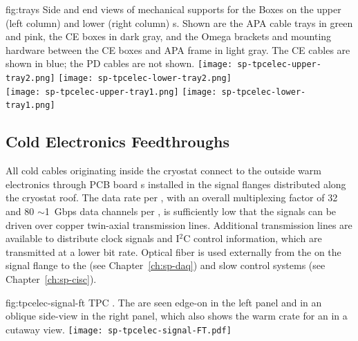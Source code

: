 \begin{dunefigure}
{fig:trays}
{Side and end views of mechanical supports for the  Boxes on the upper (left column) and lower (right column) s. Shown are the APA cable trays in green and pink, the CE boxes in dark gray, and the Omega brackets and mounting hardware between the CE boxes and APA frame in light gray.  The CE cables are shown in blue; the PD cables are not shown.}
\texttt{[image: sp-tpcelec-upper-tray2.png]}
\hspace{5mm}
\texttt{[image: sp-tpcelec-lower-tray2.png]} \\
\texttt{[image: sp-tpcelec-upper-tray1.png]}
\hspace{5mm}
\texttt{[image: sp-tpcelec-lower-tray1.png]}
\end{dunefigure}

\subsection{Cold Electronics Feedthroughs}
\label{sec:fdsp-tpcelec-design-ft}

All cold cables originating inside the cryostat connect to the outside warm electronics through PCB board \fdth{}s
installed in the signal flanges distributed along the cryostat roof.
The  data rate per , with an overall multiplexing factor of 32 and 80 $\sim$1~Gbps data channels per ,
is sufficiently low that the  signals can be driven over copper twin-axial transmission lines.
Additional transmission lines are available to distribute  clock signals and I$^2$C control information,
which are transmitted at a lower bit rate.
Optical fiber is used externally from the  on the signal flange to the  (see Chapter~\ref{ch:sp-daq}) and slow control systems (see Chapter~\ref{ch:sp-cisc}).

\begin{dunefigure}
{fig:tpcelec-signal-ft}
{TPC  \fdth. The  are seen edge-on in the left panel and in an oblique side-view in the right panel, which also shows the warm crate for an  %
in a cutaway view.}
\texttt{[image: sp-tpcelec-signal-FT.pdf]}
\end{dunefigure}

